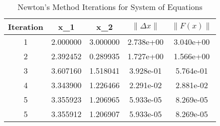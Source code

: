 \begin{table}[H]
\centering
\begin{tabular}{|c|c|c|c|c|}
\hline
Iteration & x_1 & x_2 & $\|\Delta x\|$ & $\|F(x)\|$ \\ \hline
1 & 2.000000 & 3.000000 & 2.738e+00 & 3.040e+00 \\ \hline
2 & 2.392452 & 0.289935 & 1.727e+00 & 1.566e+00 \\ \hline
3 & 3.607160 & 1.518041 & 3.928e-01 & 5.764e-01 \\ \hline
4 & 3.343900 & 1.226466 & 2.291e-02 & 2.881e-02 \\ \hline
5 & 3.355923 & 1.206965 & 5.933e-05 & 8.269e-05 \\ \hline
5 & 3.355912 & 1.206907 & 5.933e-05 & 8.269e-05 \\ \hline
\end{tabular}
\caption{Newton's Method Iterations for System of Equations}
\end{table}
